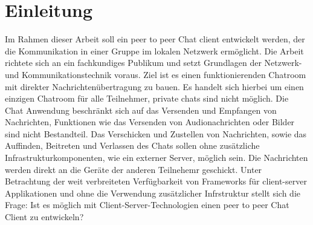 \section{Einleitung}
Im Rahmen dieser Arbeit soll ein peer to peer Chat client entwickelt werden, der die Kommunikation in einer Gruppe im lokalen Netzwerk ermöglicht. 
Die Arbeit richtete sich an ein fachkundiges Publikum und setzt Grundlagen der Netzwerk- und Kommunikationstechnik voraus.
Ziel ist es einen funktionierenden Chatroom mit direkter Nachrichtenübertragung zu bauen.
Es handelt sich hierbei um einen einzigen Chatroom für alle Teilnehmer, private chats sind nicht möglich. 
Die Chat Anwendung beschränkt sich auf das Versenden und Empfangen von Nachrichten, Funktionen wie das Versenden von Audionachrichten oder Bilder sind nicht Bestandteil. 
Das Verschicken und Zustellen von Nachrichten, sowie das Auffinden, Beitreten und Verlassen des Chats sollen ohne zusätzliche Infrastrukturkomponenten, wie ein externer Server, möglich sein.
Die Nachrichten werden direkt an die Geräte der anderen Teilnehemr geschickt. 
Unter Betrachtung der weit verbreiteten Verfügbarkeit von Frameworks für client-server Applikationen und ohne die Verwendung zusätzlicher Infrstruktur stellt sich die Frage: 
Ist es möglich mit Client-Server-Technologien einen peer to peer Chat Client zu entwickeln?